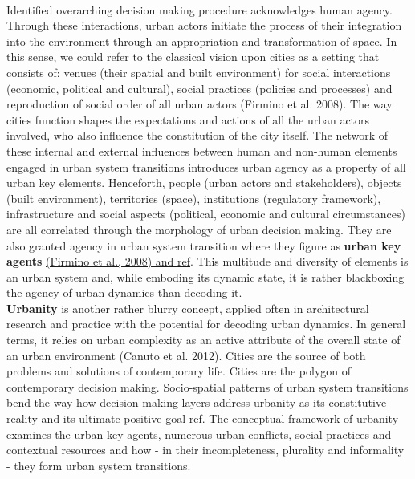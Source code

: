 \documentclass[11pt]{report}
\begin{document}
\\
Identified overarching decision making procedure acknowledges human agency. Through these interactions, urban actors initiate the process of their integration into the environment through an appropriation and transformation of space. In this sense, we could refer to the classical vision upon cities as a setting that consists of: venues (their spatial and built environment) for social interactions (economic, political and cultural), social practices (policies and processes) and reproduction of social order of all urban actors (Firmino et al. 2008). The way cities function shapes the expectations and actions of all the urban actors involved, who also influence the constitution of the city itself. The network of these internal and external influences between human and non-human elements engaged in urban system transitions introduces urban agency as a property of all urban key elements. Henceforth, people (urban actors and stakeholders), objects (built environment), territories (space), institutions (regulatory framework), infrastructure and social  aspects (political, economic and cultural circumstances) are all correlated through the morphology of urban decision making. They are also granted agency in urban system transition where they figure as \textbf{urban key agents} \href{ref}{(Firmino et al., 2008) and ref}. This multitude and diversity of elements is an urban system and, while emboding its dynamic state, it is rather blackboxing the agency of urban dynamics than decoding it.
\\
\textbf{Urbanity} is another rather blurry concept, applied often in architectural research and practice with the potential for decoding urban dynamics. In general terms, it relies on urban complexity as an active attribute of the overall state of an urban environment (Canuto et al. 2012). Cities are the source of both problems and solutions of contemporary life. Cities are the polygon of contemporary decision making. Socio-spatial patterns of urban system transitions bend the way how decision making layers address urbanity as its constitutive reality and its ultimate positive goal \href{ref}{ref}. The conceptual framework of urbanity examines the urban key agents, numerous urban conflicts, social practices and contextual resources and how - in their incompleteness, plurality and informality - they form urban system transitions.
\\
\end{document}
